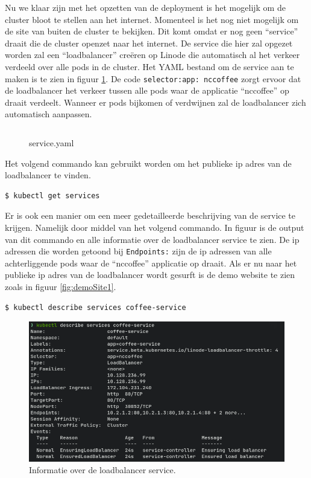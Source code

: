 Nu we klaar zijn met het opzetten van de deployment is het mogelijk om de cluster bloot te stellen aan het internet. Momenteel is het nog niet mogelijk om de site van buiten de cluster te bekijken. Dit komt omdat er nog geen ``service'' draait die de cluster openzet naar het internet. De service die hier zal opgezet worden zal een ``loadbalancer'' creëren op Linode die automatisch al het verkeer verdeeld over alle pods in de cluster. Het YAML bestand om de service aan te maken is te zien in figuur \ref{service1}. De code \verb|selector:app: nccoffee| zorgt ervoor dat de loadbalancer het verkeer tussen alle pods waar de applicatie ``nccoffee'' op draait verdeelt. Wanneer er pods bijkomen of verdwijnen zal de loadbalancer zich automatisch aanpassen. 

\begin{figure}[h] 
	\inputminted[fontsize=\footnotesize,linenos]{yaml}{files/testservice.yaml}
	\caption{service.yaml}
	\label{service1}
\end{figure}



Het volgend commando kan gebruikt worden om het publieke ip adres van de loadbalancer te vinden. 
\begin{verbatim} 
$ kubectl get services
\end{verbatim}

Er is ook een manier om een meer gedetailleerde beschrijving van de service te krijgen. Namelijk door middel van het volgend commando. In figuur is de output van dit commando en alle informatie over de loadbalancer service te zien. De ip adressen die worden getoond bij \verb|Endpoints:| zijn de ip adressen van alle achterliggende pods waar de ``nccoffee'' applicatie op draait. Als er nu naar het publieke ip adres van de loadbalancer wordt gesurft is de demo website te zien zoals in figuur \ref{fig:demoSite1}.
\begin{verbatim} 
$ kubectl describe services coffee-service 
\end{verbatim}

\begin{figure}[h]
	\centering
	\includegraphics[width=\linewidth]{img/kubectlDescriveService1.png}
	\caption{Informatie over de loadbalancer service.}
	\label{fig:kubectlDescriveService1}
\end{figure}


